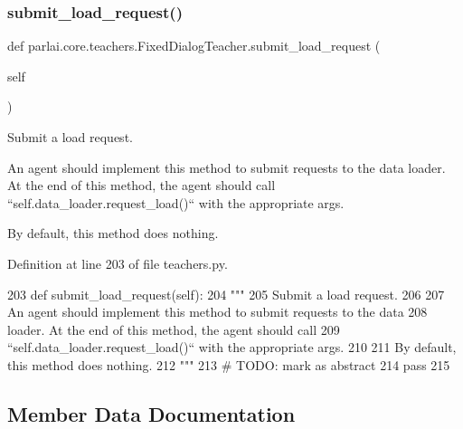 \subsubsection{\texorpdfstring{submit\+\_\+load\+\_\+request()}{submit\_load\_request()}}
{\footnotesize\ttfamily def parlai.\+core.\+teachers.\+Fixed\+Dialog\+Teacher.\+submit\+\_\+load\+\_\+request (\begin{DoxyParamCaption}\item[{}]{self }\end{DoxyParamCaption})}

\begin{DoxyVerb}Submit a load request.

An agent should implement this method to submit requests to the data
loader. At the end of this method, the agent should call
``self.data_loader.request_load()`` with the appropriate args.

By default, this method does nothing.
\end{DoxyVerb}
 

Definition at line 203 of file teachers.\+py.


\begin{DoxyCode}
203     \textcolor{keyword}{def }submit\_load\_request(self):
204         \textcolor{stringliteral}{"""}
205 \textcolor{stringliteral}{        Submit a load request.}
206 \textcolor{stringliteral}{}
207 \textcolor{stringliteral}{        An agent should implement this method to submit requests to the data}
208 \textcolor{stringliteral}{        loader. At the end of this method, the agent should call}
209 \textcolor{stringliteral}{        ``self.data\_loader.request\_load()`` with the appropriate args.}
210 \textcolor{stringliteral}{}
211 \textcolor{stringliteral}{        By default, this method does nothing.}
212 \textcolor{stringliteral}{        """}
213         \textcolor{comment}{# TODO: mark as abstract}
214         \textcolor{keywordflow}{pass}
215 
\end{DoxyCode}


\subsection{Member Data Documentation}
\mbox{\label{classparlai_1_1core_1_1teachers_1_1FixedDialogTeacher_a468d55710137a42b18f85212d7068c47}} 
